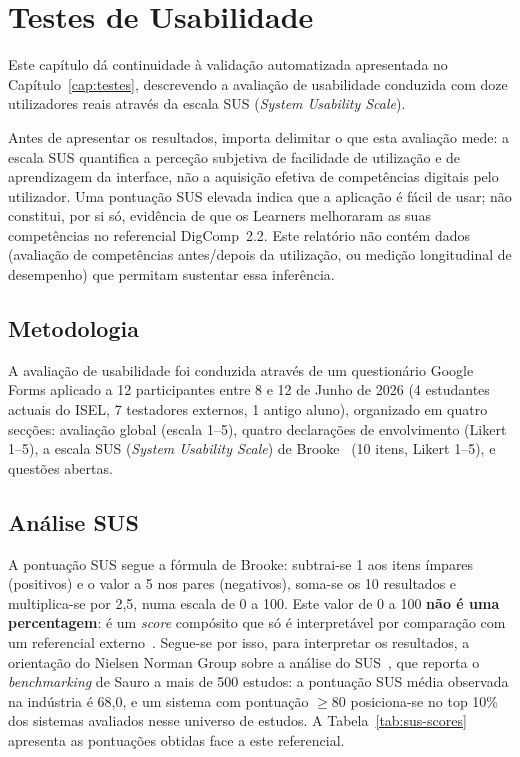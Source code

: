 %
%
\chapter{Testes de Usabilidade} \label{cap:usabilidade}

Este capítulo dá continuidade à validação automatizada apresentada no Capítulo~\ref{cap:testes}, descrevendo a avaliação de usabilidade conduzida com doze utilizadores reais através da escala SUS (\textit{System Usability Scale}).

Antes de apresentar os resultados, importa delimitar o que esta avaliação mede: a escala SUS quantifica a perceção subjetiva de facilidade de utilização e de aprendizagem da interface, não a aquisição efetiva de competências digitais pelo utilizador. Uma pontuação SUS elevada indica que a aplicação é fácil de usar; não constitui, por si só, evidência de que os Learners melhoraram as suas competências no referencial DigComp~2.2. Este relatório não contém dados (avaliação de competências antes/depois da utilização, ou medição longitudinal de desempenho) que permitam sustentar essa inferência.

\section{Metodologia} \label{sec:usab-metodologia}

A avaliação de usabilidade foi conduzida através de um questionário Google Forms aplicado a 12 participantes entre 8 e 12 de Junho de 2026 (4 estudantes actuais do ISEL, 7 testadores externos, 1 antigo aluno), organizado em quatro secções: avaliação global (escala 1–5), quatro declarações de envolvimento (Likert 1–5), a escala SUS (\textit{System Usability Scale}) de Brooke~\cite{brooke1996sus} (10 itens, Likert 1–5), e questões abertas.

\section{Análise SUS} \label{sec:usab-sus}

A pontuação SUS segue a fórmula de Brooke: subtrai-se 1 aos itens ímpares (positivos) e o valor a 5 nos pares (negativos), soma-se os 10 resultados e multiplica-se por 2,5, numa escala de 0 a 100. Este valor de 0 a 100 \textbf{não é uma percentagem}: é um \textit{score} compósito que só é interpretável por comparação com um referencial externo~\cite{nngroup2018}. Segue-se por isso, para interpretar os resultados, a orientação do Nielsen Norman Group sobre a análise do SUS~\cite{nngroup2018}, que reporta o \textit{benchmarking} de Sauro a mais de 500 estudos: a pontuação SUS média observada na indústria é 68,0, e um sistema com pontuação $\geq$80 posiciona-se no top 10\% dos sistemas avaliados nesse universo de estudos. A Tabela~\ref{tab:sus-scores} apresenta as pontuações obtidas face a este referencial.

